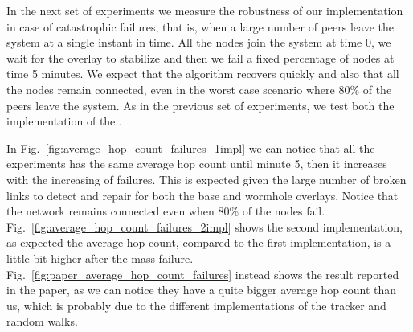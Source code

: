 \newpage
In the next set of experiments we measure the robustness of our implementation in case of catastrophic failures, that is, when a large number of peers leave the system at a single instant in time. All the nodes join the system at time 0, we wait for the overlay to stabilize and then we fail a fixed percentage of nodes at time 5 minutes. We expect that the algorithm recovers quickly and also that all the nodes remain connected, even in the worst case scenario where 80\% of the peers leave the system. As in the previous set of experiments, we test both the implementation of the \getMetropolisHastingsNeighbour.

In Fig.~\ref{fig:average_hop_count_failures_1impl} we can notice that all the experiments has the same average hop count until minute 5, then it increases with the increasing of failures. This is expected given the large number of broken links to detect and repair for both the base and wormhole overlays. Notice that the network remains connected even when 80\% of the nodes fail. Fig.~\ref{fig:average_hop_count_failures_2impl} shows the second implementation, as expected the average hop count, compared to the first implementation, is a little bit higher after the mass failure. Fig.~\ref{fig:paper_average_hop_count_failures} instead shows the result reported in the paper, as we can notice they have a quite bigger average hop count than us, which is probably due to the different implementations of the tracker and random walks.

